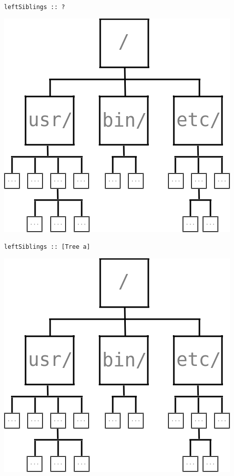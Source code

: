 \begin{frame}[fragile]
\begin{block}{\lstinline{leftSiblings :: ?}}
\begin{center}
\includegraphics[width=0.60\textheight]{image/rosetree.png}
\end{center}
\end{block}
\end{frame}

\begin{frame}[fragile]
\begin{block}{\lstinline{leftSiblings :: [Tree a]}}
\begin{center}
\includegraphics[width=0.60\textheight]{image/rosetree.png}
\end{center}
\end{block}
\end{frame}

